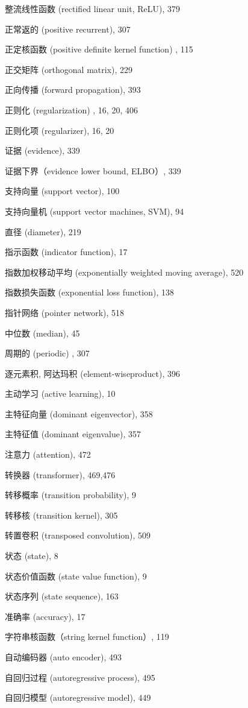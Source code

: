 \documentclass[10pt]{article}
\begin{document}
整流线性函数 (rectified linear unit, ReLU), 379

正常返的 (positive recurrent), 307

正定核函数 (positive definite kernel function) , 115

正交矩阵 (orthogonal matrix), 229

正向传播 (forward propagation), 393

正则化 (regularization) , 16, 20, 406

正则化项 (regularizer), 16, 20

证据 (evidence), 339

证据下界（evidence lower bound, ELBO）, 339

支持向量 (support vector), 100

支持向量机 (support vector machines, SVM), 94

直径 (diameter), 219

指示函数 (indicator function), 17

指数加权移动平均 (exponentially weighted moving average), 520

指数损失函数 (exponential loss function), 138

指针网络 (pointer network), 518

中位数 (median), 45

周期的 (periodic) , 307

逐元素积, 阿达玛积 (element-wiseproduct), 396

主动学习 (active learning), 10

主特征向量 (dominant eigenvector), 358

主特征值 (dominant eigenvalue), 357

注意力 (attention), 472

转换器 (transformer), 469,476

转移概率 (transition probability), 9

转移核 (transition kernel), 305

转置卷积 (transposed convolution), 509

状态 (state), 8

状态价值函数 (state value function), 9

状态序列 (state sequence), 163

准确率 (accuracy), 17

字符串核函数（string kernel function）, 119

自动编码器 (auto encoder), 493

自回归过程 (autoregressive process), 495

自回归模型 (autoregressive model), 449
\end{document}
